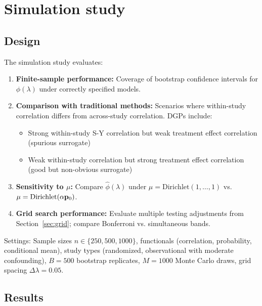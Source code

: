 \documentclass{article}
\begin{document}
\section{Simulation study}\label{sec:simulation}

\subsection{Design}

The simulation study evaluates:
\begin{enumerate}
    \item \textbf{Finite-sample performance:} Coverage of bootstrap confidence
          intervals for $\phi(\lambda)$ under correctly specified models.

    \item \textbf{Comparison with traditional methods:} Scenarios where
          within-study correlation differs from across-study correlation. DGPs include:
          \begin{itemize}
              \item Strong within-study S-Y correlation but weak treatment effect
                    correlation (spurious surrogate)
              \item Weak within-study correlation but strong treatment effect
                    correlation (good but non-obvious surrogate)
          \end{itemize}

    \item \textbf{Sensitivity to $\mu$:} Compare $\hat{\phi}(\lambda)$ under
          $\mu = \text{Dirichlet}(1,\ldots,1)$ vs. $\mu = \text{Dirichlet}(\alpha\mathbf{p}_0)$.

    \item \textbf{Grid search performance:} Evaluate multiple testing adjustments
          from Section~\ref{sec:grid}; compare Bonferroni vs. simultaneous bands.
\end{enumerate}

Settings: Sample sizes $n \in \{250, 500, 1000\}$, functionals (correlation,
probability, conditional mean), study types (randomized, observational with
moderate confounding), $B = 500$ bootstrap replicates, $M = 1000$ Monte Carlo draws,
grid spacing $\Delta\lambda = 0.05$.

\subsection{Results}
\end{document}
